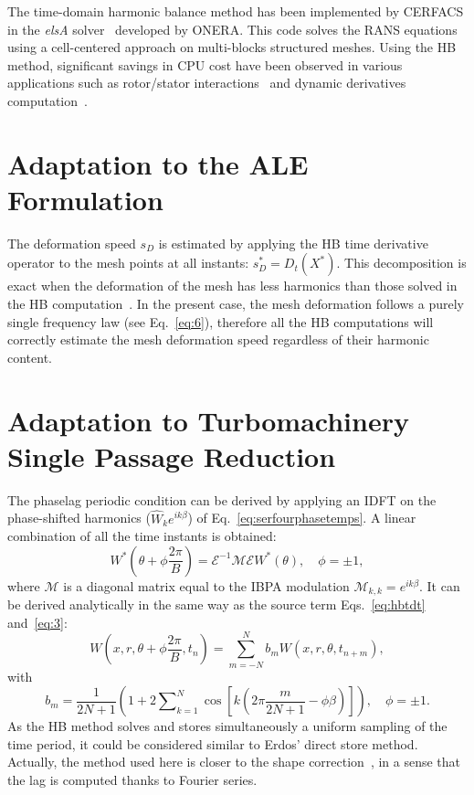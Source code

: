 The time-domain harmonic balance method has been implemented 
by CERFACS in the
\emph{elsA} solver~\cite{Cambier2013} developed by ONERA. 
This code solves the RANS equations using a cell-centered
approach on multi-blocks structured meshes.  Using the HB method,
significant savings in CPU cost have been observed in various
applications such as rotor/stator interactions~\cite{JSicot2012}
and dynamic derivatives computation~\cite{CIHassan2011}. 


\section{Adaptation to the ALE Formulation}

The deformation speed $s_D$ is estimated by applying the HB time
derivative operator to the mesh points at all instants:
$s_D^*=D_t(X^*)$. This decomposition is exact when the
deformation of the mesh has less harmonics than those solved in the
HB computation~\cite{JDufour2009}. In the present case, the mesh
deformation follows a purely single frequency law (see
Eq.~\eqref{eq:6}), therefore all the HB computations will correctly
estimate the mesh deformation speed regardless of their harmonic content.

\section{Adaptation to Turbomachinery Single Passage Reduction}
\label{sec:Adptatreduction}

The phaselag periodic condition can be derived by applying an
IDFT on the phase-shifted harmonics ($\widehat{W}_ke^{ik\beta}$) of
Eq.~\eqref{eq:serfourphasetemps}. A linear
combination of all the time instants is obtained:
\begin{equation}
  W^*\left(\theta+\phi\frac{2\pi}{B}\right)=\mathcal{E}^{-1}\mathcal{M}\mathcal{E}W^*(\theta),\quad \phi=\pm 1,
\end{equation}
where $\mathcal{M}$ is a diagonal matrix equal to the IBPA modulation
$\mathcal{M}_{k,k}=e^{i k\beta}$. It can be derived
analytically in the same way as the source term Eqs.~\eqref{eq:hbtdt}
and~\eqref{eq:3}:
\begin{equation}
  W\left(x, r, \theta+\phi\frac{2\pi}{B}, t_n\right) =\sum_{m=-N}^N
  b_mW(x, r, \theta, t_{n+m}), 
\end{equation}
with
\begin{equation}
  b_m=\frac{1}{2N+1}\left(1+2\sum\nolimits_{k=1}^N\cos\left[k\left(2\pi
        \frac{m}{2N+1}-\phi \beta\right)\right]\right),\quad \phi=\pm 1.
\end{equation}
As the HB method solves and stores simultaneously a uniform sampling
of the time period, it could be considered similar to Erdos' direct
store method. Actually, the method used here is closer to the shape
correction~\cite{He1990}, in a sense that the lag is
computed thanks to Fourier series.
